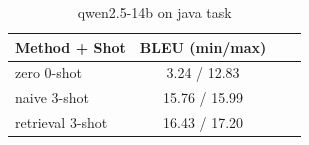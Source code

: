 \begin{table}[ht]
\centering
\small
\caption{qwen2.5-14b on java task}
\begin{tabular}{lccc}
\hline
Method + Shot & BLEU (min/max) \\
\hline
zero 0-shot & 3.24 / 12.83 \\
naive 3-shot & 15.76 / 15.99 \\
retrieval 3-shot & 16.43 / 17.20 \\
\hline
\end{tabular}
\end{table}
